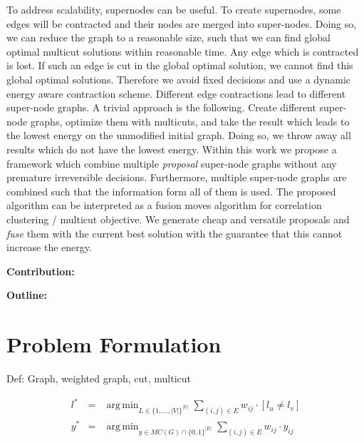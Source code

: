 \documentclass[10pt,twocolumn,letterpaper]{article}
\DeclareMathOperator*{\argmin}{arg\,min}
\begin{document}

To address scalability, supernodes can be useful.
To create supernodes, some edges will be contracted
and their nodes are merged into super-nodes.
Doing so, we can reduce  the graph 
to a reasonable size, such that we can find
global optimal multicut solutions within reasonable time.
%
Any edge which is contracted is lost.
If such an edge is cut in the global optimal solution, we cannot 
find this global optimal solutions.
Therefore we avoid fixed decisions and use a
dynamic energy aware contraction scheme.
%
Different edge contractions lead to different super-node graphs.
A trivial approach is the following.
Create different super-node graphs, optimize them with multicuts,
and take the result which leads to the lowest energy
on the unmodified initial graph.
% 
Doing so, we throw away all results which do not have the lowest energy.
Within this work we propose a framework which 
combine multiple \emph{proposal} super-node graphs
without any premature irreversible decisions.
Furthermore, multiple super-node graphs are combined such
that the information form all of them is used.
%
The proposed algorithm can be interpreted as a fusion moves
algorithm for correlation clustering / multicut objective.
We generate cheap and versatile proposals
and \emph{fuse} them with the current best solution with the
guarantee that this cannot increase the energy.


\textbf{Contribution:}

\textbf{Outline:}


\section{Problem Formulation}
Def: Graph, weighted graph, cut, multicut 


\begin{center}
    \begin{eqnarray}
        l^* &=& \argmin_{L \in \{1,\ldots,|V|\}^{|V|}} \sum_{ (i,j) \in E } w_{ij} \cdot [l_{u} \neq l_{v}] \label{eq:nodeproblem}\\
        y^* &=& \argmin_{y \in MC(G)\cap \{0,1\}^{|E|}} \sum_{ (i,j) \in E } w_{ij} \cdot y_{ij} \label{eq:edgeproblem}%
    \end{eqnarray}
\end{center}
\end{document}
